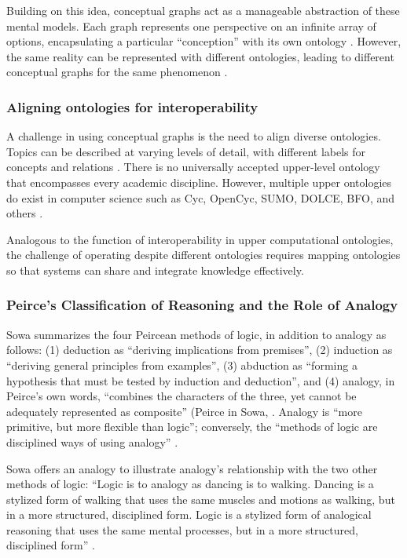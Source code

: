 Building on this idea, conceptual graphs act as a manageable abstraction of these mental models. Each graph represents one perspective on an infinite array of options, encapsulating a particular “conception” with its own ontology \citep[p. 8]{sowa_goal_2008}. However, the same reality can be represented with different ontologies, leading to different conceptual graphs for the same phenomenon \citep[p. 8]{sowa_goal_2008}.

\subsubsection{Aligning ontologies for interoperability}
A challenge in using conceptual graphs is the need to align diverse ontologies. Topics can be described at varying levels of detail, with different labels for concepts and relations \citep[p. 8]{sowa_goal_2008}. There is no universally accepted upper-level ontology that encompasses every academic discipline. However, multiple upper ontologies do exist in computer science such as Cyc, OpenCyc, SUMO, DOLCE, BFO, and others \citep[p. 3]{lopez-gil_web_2016}. 

Analogous to the function of interoperability in upper computational ontologies, the challenge of operating despite different ontologies requires mapping ontologies so that systems can share and integrate knowledge effectively.

\subsubsection{Peirce’s Classification of Reasoning and the Role of Analogy}
Sowa summarizes the four Peircean methods of logic, in addition to analogy as follows: (1) deduction as ``deriving implications from premises”, (2) induction as “deriving general principles from examples”, (3) abduction as ``forming a hypothesis that must be tested by induction and deduction”, and (4) analogy, in Peirce’s own words, ``combines the characters of the three, yet cannot be adequately represented as composite” (Peirce in Sowa, \citep[p. 20]{sowa_challenge_2004}. Analogy is ``more primitive, but more flexible than logic”; conversely, the ``methods of logic are disciplined ways of using analogy” \citep[p. 20]{sowa_challenge_2004}. 

Sowa offers an analogy to illustrate analogy’s relationship with the two other methods of logic: ``Logic is to analogy as dancing is to walking. Dancing is a stylized form of walking that uses the same muscles and motions as walking, but in a more structured, disciplined form. Logic is a stylized form of analogical reasoning that uses the same mental processes, but in a more structured, disciplined form”  \citep[p. 28]{sowa_challenge_2004}. 

